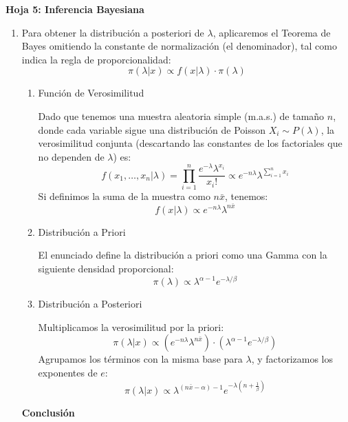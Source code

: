 \begin{center}
	\Large \textbf{Hoja 5: Inferencia Bayesiana}
\end{center}

\begin{enumerate}[label=\color{red}\textbf{\arabic*)}]
	\item {}

	      Para obtener la distribución a posteriori de $\lambda$, aplicaremos el Teorema de Bayes omitiendo la constante de normalización (el denominador), tal como indica la regla de proporcionalidad: \[
		      \pi(\lambda|x)\propto f(x|\lambda)\cdot \pi(\lambda)
	      \]
	      \begin{enumerate}[label=\arabic*)]
		      \item Función de Verosimilitud

		            Dado que tenemos una muestra aleatoria simple (m.a.s.) de tamaño $n$, donde cada variable sigue una distribución de Poisson $X_i\sim P(\lambda)$, la verosimilitud conjunta (descartando las constantes de los factoriales que no dependen de $\lambda$) es: \[
			            f(x_1,\dots,x_n|\lambda)=\prod_{i=1}^{n} \dfrac{e^{-\lambda}\lambda^{x_{i}} }{x_{i}!}\propto e^{-n\lambda}\lambda^{\sum_{i=1}^{n} x_{i}}
		            \]
		            Si definimos la suma de la muestra como $n\bar{x}$, tenemos: \[
			            f(x|\lambda)\propto e^{-n\lambda} \lambda^{n\bar{x}}
		            \]
		      \item Distribución a Priori

		            El enunciado define la distribución a priori como una Gamma con la siguiente densidad proporcional: \[
			            \pi(\lambda)\propto \lambda^{\alpha-1}e^{-\lambda / \beta}
		            \]
		      \item Distribución a Posteriori

		            Multiplicamos la verosimilitud por la priori: \[
			            \pi(\lambda|x)\propto \left( e^{-n\lambda}\lambda^{n \bar{x}}\right) \cdot  \left( \lambda^{\alpha-1}e^{-\lambda / \beta}  \right)
		            \]
		            Agrupamos los términos con la misma base para $\lambda$, y factorizamos los exponentes de $e$: \[
			            \pi(\lambda|x)\propto \lambda^{(n\bar{x}-\alpha)-1}e^{-\lambda \left( n+\frac{1}{\beta}\right)}
		            \]
	      \end{enumerate}
	      \textbf{Conclusión}


\end{enumerate}
